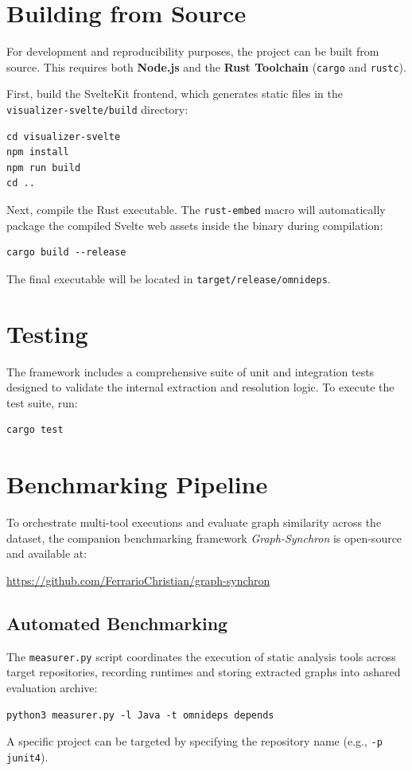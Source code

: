 \section{Building from Source}
For development and reproducibility purposes, the project can be
built from source. This requires both \textbf{Node.js} and the
\textbf{Rust Toolchain} (\texttt{cargo} and \texttt{rustc}).

First, build the SvelteKit frontend, which generates static files in
the \\ \texttt{visualizer-svelte/build} directory:
\begin{verbatim}
cd visualizer-svelte
npm install
npm run build
cd ..
\end{verbatim}

Next, compile the Rust executable. The \texttt{rust-embed} macro will
automatically package the compiled Svelte web assets inside the
binary during compilation:
\begin{verbatim}
cargo build --release
\end{verbatim}
The final executable will be located in \texttt{target/release/omnideps}.

\section{Testing}
The framework includes a comprehensive suite of unit and integration
tests designed to validate the internal extraction and resolution
logic. To execute the test suite, run:
\begin{verbatim}
cargo test
\end{verbatim}

\section{Benchmarking Pipeline}
To orchestrate multi-tool executions and evaluate graph similarity across the
dataset, the companion benchmarking framework \textit{Graph-Synchron} is
open-\linebreak source and available at:
\begin{center}
  \url{https://github.com/FerrarioChristian/graph-synchron}
\end{center}

\subsection*{Automated Benchmarking}
The \texttt{measurer.py} script coordinates the execution of static analysis
tools across target repositories, recording runtimes and storing extracted
graphs into a\linebreak shared evaluation archive:
\begin{verbatim}
python3 measurer.py -l Java -t omnideps depends
\end{verbatim}
A specific project can be targeted by specifying the repository name (e.g.,
\texttt{-p junit4}).

